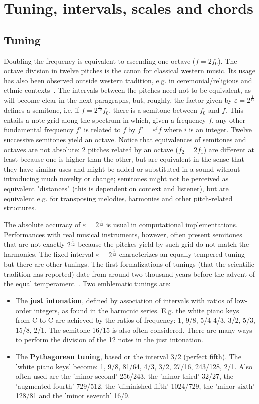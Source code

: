 \documentclass[format=acmsmall, review=false, screen=true]{acmart}
\begin{document}
\section{Tuning, intervals, scales and chords}\label{subsec:afinacao}
\subsection{Tuning}
Doubling the frequency is equivalent to ascending one octave ($f=2f_0$).
The octave division in twelve pitches is the canon for classical western music.
Its usage has also been observed
outside western tradition, e.g. in ceremonial/religious and ethnic contexts~\cite{Wisnick}.
The intervals between the pitches need not to be equivalent,
as will become clear in the next paragraphs, but, roughly,
the factor given by $\varepsilon=2^{\frac{1}{12}}$ defines a semitone,
i.e. if $f=2^{\frac{1}{12}}f_0$, there is a semitone between
$f_0$ and $f$.
This entails a note grid along the spectrum in which, given a frequency $f$,
any other fundamental frequency $f'$ is related to $f$ by $f'= \varepsilon^i f$ where $i$ is an integer.
Twelve successive semitones yield an
octave.
Notice that equivalences of semitones and octaves are not absolute:
2 pitches related by an octave ($f_2 = 2f_1$) are different at least because one is higher than the other,
but are equivalent in the sense that they have similar uses and might be added or substituted
in a sound without introducing much novelty or change;
semitones might not be perceived as equivalent "distances"
(this is dependent on context and listener),
but are equivalent e.g. for transposing melodies, harmonies
and other pitch-related structures.

The absolute accuracy of $\varepsilon=2^\frac{1}{12}$ is usual in computational implementations.
Performances with real musical instruments, however, often present semitones that are not exactly $2^{\frac{1}{12}}$
because the pitches yield by such grid do not match the harmonics.
The fixed interval $\varepsilon=2^{\frac{1}{12}}$ characterizes an equally tempered tuning but there are other tunings. The first formalizations of tunings (that the scientific tradition has reported) date from around two thousand years before the advent of the equal temperament~\cite{Roederer}.
Two emblematic tunings are:
\begin{itemize}
    \item The {\bf just intonation}, defined by association of intervals with ratios of low-order integers, as found in the harmonic series. E.g. the white piano keys from C to C are achieved by the ratios of frequency: 1, 9/8, 5/4
    4/3, 3/2, 5/3, 15/8, 2/1. The semitone 16/15 is also often considered.
		There are many ways to perform the division of the 12 notes in the just intonation.
    \item The {\bf Pythagorean tuning}, based on the interval 3/2 (perfect fifth). The 'white piano keys' become: 1, 9/8, 81/64, 4/3, 3/2, 27/16, 243/128, 2/1. Also often used are the 'minor second' 256/243, the 'minor third' 32/27, the 'augmented fourth' 729/512, the 'diminished fifth' 1024/729, the 'minor sixth' 128/81 and the 'minor seventh' 16/9. 
\end{itemize}
\end{document}
